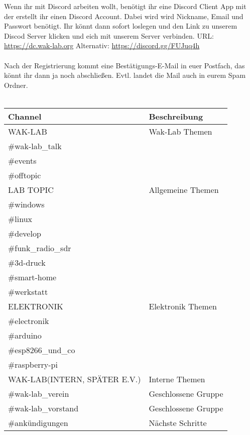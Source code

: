 Wenn ihr mit Discord arbeiten wollt, benötigt ihr eine Discord Client App mit der erstellt ihr einen Discord Account. Dabei wird wird Nickname, Email und Passwort benötigt. Ihr könnt dann sofort loslegen und den Link zu unserem Discod Server klicken und eich mit unserem Server verbinden. URL: \url{https://dc.wak-lab.org} Alternativ: \url{https://discord.gg/FUJuq4h}\\
\ \\
Nach der Registrierung kommt eine Bestätigungs-E-Mail in euer Postfach, das könnt ihr dann ja noch abschließen. Evtl. landet die Mail auch in eurem Spam Ordner. \\
\ \\
\begin{raggedright}
\begin{tabular}{|p{}|p{}|}
\hline
\textbf{Channel} & \textbf{Beschreibung}\\
\hline
WAK-LAB & Wak-Lab Themen\\
\cline{1-1}
\#wak-lab\_talk & \\
\cline{1-1}
\#events & \\
\cline{1-1}
\#offtopic & \\
\hline
LAB TOPIC & Allgemeine Themen\\
\cline{1-1}
\#windows & \\
\cline{1-1}
\#linux & \\
\cline{1-1}
\#develop & \\
\cline{1-1}
\#funk\_radio\_sdr & \\
\cline{1-1}
\#3d-druck & \\
\cline{1-1}
\#smart-home & \\
\cline{1-1}
\#werkstatt & \\
\hline
ELEKTRONIK & Elektronik Themen\\
\cline{1-1}
\#electronik & \\
\cline{1-1}
\#arduino & \\
\cline{1-1}
\#esp8266\_und\_co & \\
\cline{1-1}
\#raspberry-pi & \\
\hline
WAK-LAB(INTERN, SPÄTER E.V.) & Interne Themen\\
\cline{1-1}
\#wak-lab\_verein & Geschlossene Gruppe\\
\cline{1-1}
\#wak-lab\_vorstand & Geschlossene Gruppe\\
\cline{1-1}
\#ankündigungen & Nächste Schritte\\
\hline
\end{tabular}
\label{tab:Channels}
\end{raggedright}


